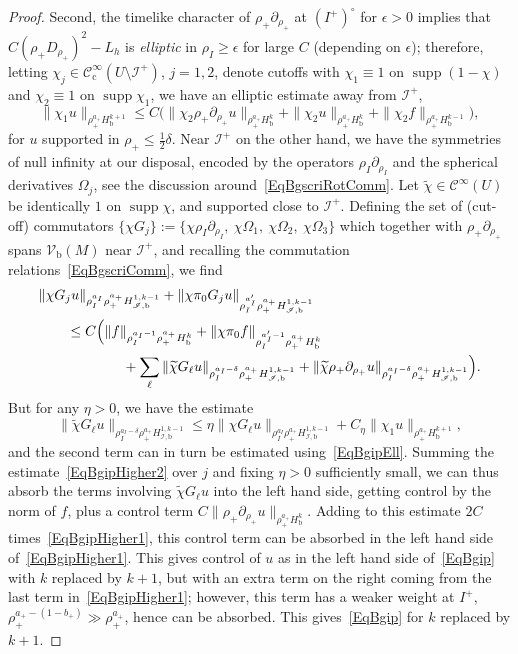 \documentclass[reqno,11pt,letterpaper]{amsart}
\numberwithin{equation}{section}
\numberwithin{figure}{section}
\theoremstyle{definition}
\theoremstyle{remark}
\newcommand{\mc}{\mathcal}
\newcommand{\cC}{\mc C}
\newcommand{\ms}{\mathscr}
\newcommand{\scri}{\ms I}
\newcommand{\supp}{\operatorname{supp}}
\newcommand{\eps}{\epsilon}
\newcommand{\pa}{\partial}
\newcommand{\wt}{\widetilde}
\newcommand{\bop}{{\mathrm{b}}}
\newcommand{\cp}{{\mathrm{c}}}
\newcommand{\Vf}{\mathcal V}
\newcommand{\Vb}{\Vf_\bop}
\newcommand{\half}{\tfrac{1}{2}}
\newcommand{\CI}{\cC^\infty}
\newcommand{\CIc}{\cC^\infty_\cp}
\newcommand{\Hb}{H_{\bop}}
\newcommand{\Hscrib}{H_{\scri,\bop}}
\begin{document}
\begin{proof}
  Second, the timelike character of $\rho_+\pa_{\rho_+}$ at $(I^+)^\circ$ for $\eps>0$ implies that $C(\rho_+ D_{\rho_+})^2-L_h$ is \emph{elliptic} in $\rho_I\geq\eps$ for large $C$ (depending on $\eps$); therefore, letting $\chi_j\in\CIc(U\setminus\scri^+)$, $j=1,2$, denote cutoffs with $\chi_1\equiv 1$ on $\supp(1-\chi)$ and $\chi_2\equiv 1$ on $\supp\chi_1$, we have an elliptic estimate away from $\scri^+$,
  \begin{equation}
  \label{EqBgipEll}
    \| \chi_1 u \|_{\rho_+^{a_+}\Hb^{k+1}} \leq C\bigl( \| \chi_2\rho_+\pa_{\rho_+}u \|_{\rho_+^{a_+}\Hb^k} + \| \chi_2 u \|_{\rho_+^{a_+}\Hb^k} + \| \chi_2 f \|_{\rho_+^{a_+}\Hb^{k-1}}\bigr),
  \end{equation}
  for $u$ supported in $\rho_+\leq\half\delta$. Near $\scri^+$ on the other hand, we have the symmetries of null infinity at our disposal, encoded by the operators $\rho_I\pa_{\rho_I}$ and the spherical derivatives $\Omega_j$, see the discussion around~\eqref{EqBgscriRotComm}. Let $\wt\chi\in\CI(U)$ be identically $1$ on $\supp\chi$, and supported close to $\scri^+$. Defining the set of (cut-off) commutators $\{\chi G_j\}:=\{\chi\rho_I\pa_{\rho_I},\ \chi\Omega_1,\ \chi\Omega_2,\ \chi\Omega_3\}$ which together with $\rho_+\pa_{\rho_+}$ spans $\Vb(M)$ near $\scri^+$, and recalling the commutation relations~\eqref{EqBgscriComm}, we find
  \begin{equation}
  \label{EqBgipHigher2}
  \begin{split}
    &\|\chi G_j u\|_{\rho_I^{a_I}\rho_+^{a_+}\Hscrib^{1,k-1}} + \|\chi\pi_0 G_j u\|_{\rho_I^{a'_I}\rho_+^{a_+}\Hscrib^{1,k-1}} \\
    &\qquad \leq C\Bigl(\|f\|_{\rho_I^{a_I-1}\rho_+^{a_+}\Hb^k} + \|\chi\pi_0 f\|_{\rho_I^{a'_I-1}\rho_+^{a_+}\Hb^k} \\
    &\qquad\qquad\qquad + \sum_\ell\|\wt\chi G_\ell u\|_{\rho_I^{a_I-\delta}\rho_+^{a_+}\Hscrib^{1,k-1}} + \|\wt\chi\rho_+\pa_{\rho_+}u\|_{\rho_I^{a_I-\delta}\rho_+^{a_+}\Hscrib^{1,k-1}} \Bigr).
  \end{split}
  \end{equation}
  But for any $\eta>0$, we have the estimate
  \[
    \|\wt\chi G_\ell u\|_{\rho_I^{a_I-\delta}\rho_+^{a_+}\Hscrib^{1,k-1}} \leq \eta\|\chi G_\ell u\|_{\rho_I^{a_I}\rho_+^{a_+}\Hscrib^{1,k-1}} + C_\eta\|\chi_1 u\|_{\rho_+^{a_+}\Hb^{k+1}},
  \]
  and the second term can in turn be estimated using~\eqref{EqBgipEll}. Summing the estimate~\eqref{EqBgipHigher2} over $j$ and fixing $\eta>0$ sufficiently small, we can thus absorb the terms involving $\wt\chi G_\ell u$ into the left hand side, getting control by the norm of $f$, plus a control term $C\|\rho_+\pa_{\rho_+}u\|_{\rho_+^{a_+}\Hb^k}$. Adding to this estimate $2 C$ times~\eqref{EqBgipHigher1}, this control term can be absorbed in the left hand side of~\eqref{EqBgipHigher1}. This gives control of $u$ as in the left hand side of~\eqref{EqBgip} with $k$ replaced by $k+1$, but with an extra term on the right coming from the last term in~\eqref{EqBgipHigher1}; however, this term has a weaker weight at $I^+$, $\rho_+^{a_+-(1-b_+)}\gg\rho_+^{a_+}$, hence can be absorbed. This gives~\eqref{EqBgip} for $k$ replaced by $k+1$.
\end{proof}
\end{document}
